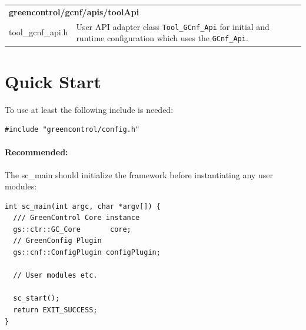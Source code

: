 \vspace{1 cm}



\noindent
\begin{minipage}{\textwidth}
\begin{tabularx}{\textwidth}{|l|X|}
	\cline{1-1}\cline{2-2}\multicolumn{2}{|l|}{  {\bf\sffamily greencontrol/gcnf/apis/toolApi}    }\\
	\cline{1-1}\cline{2-2} tool\_gcnf\_api.h    &  User API adapter class \lstinline|Tool_GCnf_Api| for initial and runtime configuration which uses the \lstinline|GCnf_Api|.   \\
	\hline
\end{tabularx}
\end{minipage}


\section{Quick Start}

To use \GreenConfig at least the following include is needed:
\begin{lstlisting}
#include "greencontrol/config.h"
\end{lstlisting}

\noindent
\begin{minipage}{\textwidth}
\paragraph{Recommended:} The {\sffamily sc\_main} should initialize the framework before instantiating any user modules:
\begin{lstlisting}
int sc_main(int argc, char *argv[]) {
  /// GreenControl Core instance
  gs::ctr::GC_Core       core;
  // GreenConfig Plugin
  gs::cnf::ConfigPlugin configPlugin;

  // User modules etc.

  sc_start();
  return EXIT_SUCCESS;
}
\end{lstlisting}
\end{minipage}

